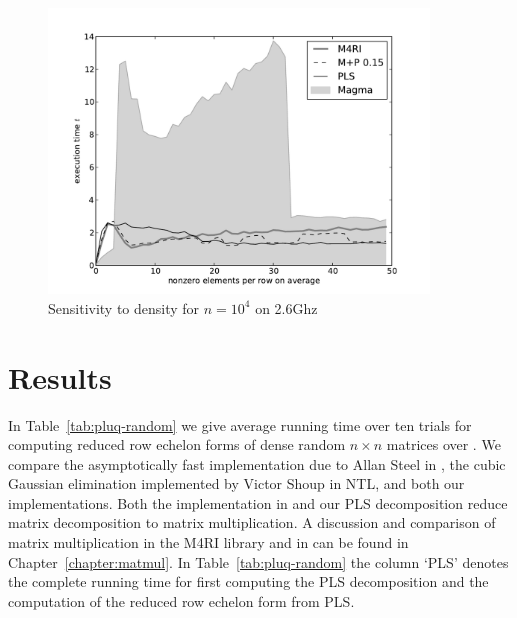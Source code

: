 \begin{figure}
 \centering
 \includegraphics[width=0.9\textwidth]{./pluq-m4ri-magma-10000-prai243-20100409.pdf}
 \caption{Sensitivity to density for $n=10^4$ on 2.6Ghz \Opteron}
 \label{fig:sparse-m4ri}
\end{figure}

\section{Results}
\label{sec:pluq-results}
In Table~\ref{tab:pluq-random} we give average running time over ten trials for computing reduced row echelon forms of dense random $n \times n$ matrices over \GFZ. We compare the asymptotically fast implementation due to Allan Steel in \Magma, the cubic Gaussian elimination implemented by Victor Shoup in NTL, and both our implementations. Both the implementation in \Magma and our PLS decomposition reduce matrix decomposition to matrix multiplication. A discussion and comparison of matrix multiplication in the M4RI library and in \Magma can be found in Chapter~\ref{chapter:matmul}. In Table~\ref{tab:pluq-random} the column `PLS' denotes the complete running time for first computing the PLS decomposition and the computation of the reduced row echelon form from PLS. 

